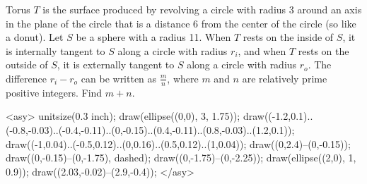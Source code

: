 Torus $T$ is the surface produced by revolving a circle with radius 3 around an axis in the plane of the circle that is a distance 6 from the center of the circle (so like a donut). Let $S$ be a sphere with a radius 11. When $T$ rests on the inside of $S$, it is internally tangent to $S$ along a circle with radius $r_i$, and when $T$ rests on the outside of $S$, it is externally tangent to $S$ along a circle with radius $r_o$. The difference $r_i-r_o$ can be written as $\frac{m}{n}$, where $m$ and $n$ are relatively prime positive integers. Find $m+n$.

<asy>
unitsize(0.3 inch);
draw(ellipse((0,0), 3, 1.75));
draw((-1.2,0.1)..(-0.8,-0.03)..(-0.4,-0.11)..(0,-0.15)..(0.4,-0.11)..(0.8,-0.03)..(1.2,0.1));
draw((-1,0.04)..(-0.5,0.12)..(0,0.16)..(0.5,0.12)..(1,0.04));
draw((0,2.4)--(0,-0.15));
draw((0,-0.15)--(0,-1.75), dashed);
draw((0,-1.75)--(0,-2.25));
draw(ellipse((2,0), 1, 0.9));
draw((2.03,-0.02)--(2.9,-0.4));
</asy>
